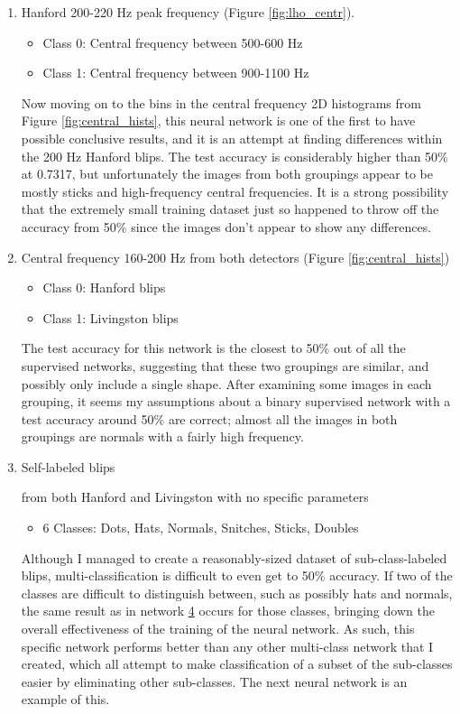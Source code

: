 \documentclass[a4paper]{article}
\begin{document}
\begin{enumerate}
	\item Hanford 200-220 Hz peak frequency (Figure \ref{fig:lho_centr}). 
	\begin{itemize}
		\item Class 0: Central frequency between 500-600 Hz
		\item Class 1: Central frequency between 900-1100 Hz
	\end{itemize} Now moving on to the bins in the central frequency 2D histograms from Figure \ref{fig:central_hists}, this neural network is one of the first to have possible conclusive results, and it is an attempt at finding differences within the 200 Hz Hanford blips. The test accuracy is considerably higher than 50\% at 0.7317, but unfortunately the images from both groupings appear to be mostly sticks and high-frequency central frequencies. It is a strong possibility that the extremely small training dataset just so happened to throw off the accuracy from 50\% since the images don't appear to show any differences. 
	
	\item Central frequency 160-200 Hz from both detectors (Figure \ref{fig:central_hists})
	\begin{itemize}
		\item Class 0: Hanford blips
		\item Class 1: Livingston blips
	\end{itemize} The test accuracy for this network is the closest to 50\% out of all the supervised networks, suggesting that these two groupings are similar, and possibly only include a single shape. After examining some images in each grouping, it seems my assumptions about a binary supervised network with a test accuracy around 50\% are correct; almost all the images in both groupings are normals with a fairly high frequency. 
	
	\item \hypertarget{multi}{Self-labeled blips} from both Hanford and Livingston with no specific parameters
	\begin{itemize}
		\item 6 Classes: Dots, Hats, Normals, Snitches, Sticks, Doubles
	\end{itemize} Although I managed to create a reasonably-sized dataset of sub-class-labeled blips, multi-classification is difficult to even get to 50\% accuracy. If two of the classes are difficult to distinguish between, such as possibly hats and normals, the same result as in network \hyperlink{binary}{4} occurs for those classes, bringing down the overall effectiveness of the training of the neural network. As such, this specific network performs better than any other multi-class network that I created, which all attempt to make classification of a subset of the sub-classes easier by eliminating other sub-classes. The next neural network is an example of this.
	

\end{enumerate}
\end{document}
